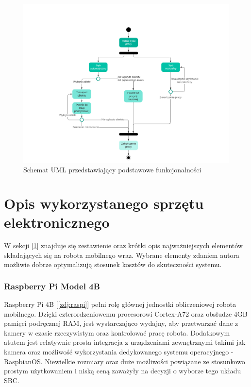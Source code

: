 \begin{figure}[H]
    \centering
    \includegraphics[width=1.0\textwidth]{./graf/uml1.png}
    \caption{Schemat UML przedstawiający podstawowe funkcjonalności}
    \label{rys1:schemat_uml}
\end{figure}

\section{Opis wykorzystanego sprzętu elektronicznego}
\label{sek:opis-sprzetu}
W sekcji [\ref{sek:opis-sprzetu}] znajduje się zestawienie oraz krótki opis najważniejszych elementów składających się na robota mobilnego wraz. Wybrane elementy zdaniem autora możliwie dobrze optymalizują stosunek kosztów do skuteczności systemu. 

\subsubsection*{Raspberry Pi Model 4B}
Raspberry Pi 4B [\ref{zdj:raspi}] pełni rolę głównej jednostki obliczeniowej robota mobilnego. Dzięki czterordzeniowemu procesorowi Cortex-A72 oraz obsłudze 4GB pamięci podręcznej RAM, jest wystarczająco wydajny, aby przetwarzać dane z kamery w czasie rzeczywistym oraz kontrolować pracę robota. Dodatkowym atutem jest relatywnie prosta integracja z urządzeniami zewnętrznymi takimi jak kamera oraz możliwość wykorzystania dedykowanego systemu operacyjnego - RaspbianOS. Niewielkie rozmiary oraz duże możliwości powiązane ze stosunkowo prostym użytkowaniem i niską ceną zaważyły na decyzji o wyborze tego układu SBC. 

